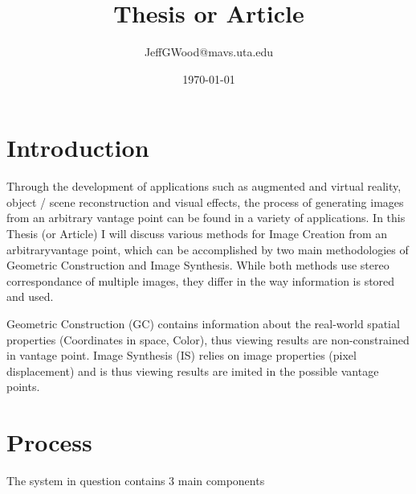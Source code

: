 \documentclass[a4paper,10pt]{article}
\title{Thesis or Article}
\author{JeffGWood@mavs.uta.edu}
\date{\today}
\newcommand{\cAij}[2]{\ensuremath{a_{{#1},{#2}}}}
\begin{document}
\maketitle
\newpage
\tableofcontents
\newpage


\normalsize
\section{Introduction}
\par Through the development of applications such as augmented and virtual reality, object / scene reconstruction and visual effects, the process of generating images from an arbitrary vantage point can be found in a variety of applications. In this Thesis (or Article) I will discuss various methods for Image Creation from an arbitraryvantage point, which can be accomplished by two main methodologies of Geometric Construction and Image Synthesis. While both methods use stereo correspondance of multiple images, they differ in the way information is stored and used.
\par Geometric Construction (GC) contains information about the real-world spatial properties (Coordinates in space, Color), thus viewing results are non-constrained in vantage point. Image Synthesis (IS) relies on image properties (pixel displacement) and is thus viewing results are imited in the possible vantage points.
\section{Process}
The system in question contains 3 main components

\begin{equation*}
\end{equation*}


%
\end{document}
